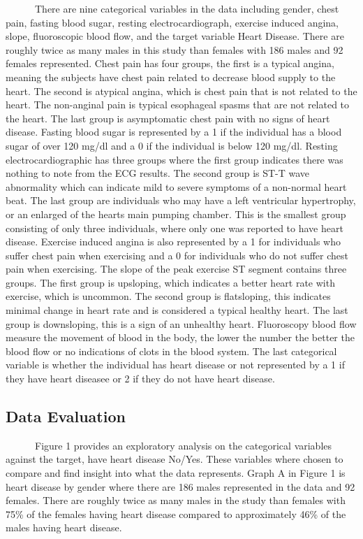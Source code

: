 \documentclass[
]{article}
\begin{document}
~~~~~~There are nine categorical variables in the data including gender,
chest pain, fasting blood sugar, resting electrocardiograph, exercise
induced angina, slope, fluoroscopic blood flow, and the target variable
Heart Disease. There are roughly twice as many males in this study than
females with 186 males and 92 females represented. Chest pain has four
groups, the first is a typical angina, meaning the subjects have chest
pain related to decrease blood supply to the heart. The second is
atypical angina, which is chest pain that is not related to the heart.
The non-anginal pain is typical esophageal spasms that are not related
to the heart. The last group is asymptomatic chest pain with no signs of
heart disease. Fasting blood sugar is represented by a 1 if the
individual has a blood sugar of over 120 mg/dl and a 0 if the individual
is below 120 mg/dl. Resting electrocardiographic has three groups where
the first group indicates there was nothing to note from the ECG
results. The second group is ST-T wave abnormality which can indicate
mild to severe symptoms of a non-normal heart beat. The last group are
individuals who may have a left ventricular hypertrophy, or an enlarged
of the hearts main pumping chamber. This is the smallest group
consisting of only three individuals, where only one was reported to
have heart disease. Exercise induced angina is also represented by a 1
for individuals who suffer chest pain when exercising and a 0 for
individuals who do not suffer chest pain when exercising. The slope of
the peak exercise ST segment contains three groups. The first group is
upsloping, which indicates a better heart rate with exercise, which is
uncommon. The second group is flatsloping, this indicates minimal change
in heart rate and is considered a typical healthy heart. The last group
is downsloping, this is a sign of an unhealthy heart. Fluoroscopy blood
flow measure the movement of blood in the body, the lower the number the
better the blood flow or no indications of clots in the blood system.
The last categorical variable is whether the individual has heart
disease or not represented by a 1 if they have heart diseasee or 2 if
they do not have heart disease.

\hypertarget{data-evaluation}{%
\subsection{Data Evaluation}\label{data-evaluation}}

~~~~~~Figure 1 provides an exploratory analysis on the categorical
variables against the target, have heart disease No/Yes. These variables
where chosen to compare and find insight into what the data represents.
Graph A in Figure 1 is heart disease by gender where there are 186 males
represented in the data and 92 females. There are roughly twice as many
males in the study than females with 75\% of the females having heart
disease compared to approximately 46\% of the males having heart
disease.
\end{document}
